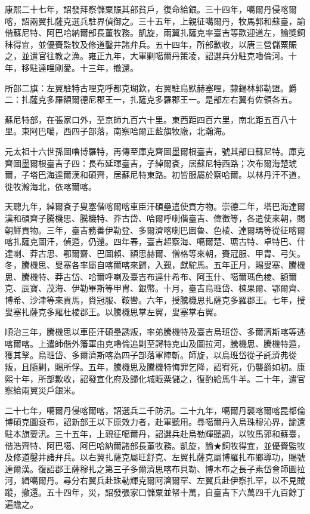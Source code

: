 \begin{pinyinscope}
康熙二十七年，詔發拜察儲粟賑其部貧戶，復命給銀。三十四年，噶爾丹侵喀爾喀，詔兩翼扎薩克選兵駐界偵御之。三十五年，上親征噶爾丹，牧馬郭和蘇臺，諭偕蘇尼特、阿巴哈納爾部長董牧務。凱旋，兩翼扎薩克率臺吉等歡迎道左，諭獎飼秣得宜，並優賚監牧及修道鑿井諸弁兵。五十四年，所部歉收，以唐三營儲粟賑之，並遣官往教之漁。雍正九年，大軍剿噶爾丹策凌，詔選兵分駐克嚕倫河。十年，移駐達哩剛愛。十三年，撤還。

所部二旗：左翼駐特古哩克呼都克瑚欽，右翼駐烏默赫塞哩，隸錫林郭勒盟。爵二：扎薩克多羅額爾德尼郡王一，扎薩克多羅郡王一。是部左右翼有佐領各五。

蘇尼特部，在張家口外，至京師九百六十里。東西距四百六里，南北距五百八十里。東阿巴噶，西四子部落，南察哈爾正藍旗牧廠，北瀚海。

元太祖十六世孫圖嚕博羅特，再傳至庫克齊圖墨爾根臺吉，號其部曰蘇尼特。庫克齊圖墨爾根臺吉子四：長布延琿臺吉，子綽爾袞，居蘇尼特西路；次布爾海楚琥爾，子塔巴海達爾漢和碩齊，居蘇尼特東路。初皆服屬於察哈爾。以林丹汗不道，徙牧瀚海北，依喀爾喀。

天聰九年，綽爾袞子叟塞偕喀爾喀車臣汗碩壘遣使貢方物。崇德二年，塔巴海達爾漢和碩齊子騰機思、騰機特、莽古岱、哈爾呼喇偕臺吉、偉徵等，各遣使來朝，賜朝鮮貢物。三年，臺吉務善伊勒登、多爾濟喀喇巴圖魯、色棱、達爾瑪等從征喀爾喀扎薩克圖汗，偵遁，仍還。四年春，臺吉超察海、噶爾楚、瑭古特、卓特巴、什達喇、莽古思、鄂爾齋、巴圖賴、額思赫爾、僧格等來朝，賚冠服、甲胄、弓矢。冬，騰機思、叟塞各率屬自喀爾喀來歸，入覲，獻駝馬。五年正月，賜叟塞、騰機思、騰機特、莽古岱、哈爾呼喇及臺吉布達什希布、阿玉什、噶爾瑪色棱、額爾克、辰寶、茂海、伊勒畢斯等甲胄、銀幣。十月，臺吉烏班岱、棟果爾、鄂爾齊、博希、沙津等來貢馬，賚冠服、鞍轡。六年，授騰機思扎薩克多羅郡王。七年，授叟塞扎薩克多羅杜棱郡王。以騰機思掌左翼，叟塞掌右翼。

順治三年，騰機思以車臣汗碩壘誘叛，率弟騰機特及臺吉烏班岱、多爾濟斯喀等逃喀爾喀。上遣師偕外籓軍由克嚕倫追剿至諤特克山及圖拉河，騰機思、騰機特遁，獲其孥。烏班岱、多爾濟斯喀為四子部落軍陣斬。師旋，以烏班岱從子託濟弗從叛，且隨剿，賜所俘。五年，騰機思及騰機特悔罪乞降，詔宥死，仍襲爵如初。康熙十年，所部歉收，詔發宣化府及歸化城賑粟儲之，復酌給馬牛羊。二十年，遣官察給兩翼災戶銀米。

二十七年，噶爾丹侵喀爾喀，詔選兵二千防汛。二十九年，噶爾丹襲喀爾喀昆都倫博碩克圖袞布，詔新部王以下原效力者，赴軍聽用。尋噶爾丹入烏珠穆沁界，諭還駐本旗要汛。三十五年，上親征噶爾丹，詔選兵赴烏勒輝聽調，以牧馬郭和蘇臺，偕浩齊特、阿巴噶、阿巴哈納爾諸部長董牧務。凱旋，諭★飼牧得宜，並優賚監牧及修道鑿井諸弁兵。以右翼扎薩克屬旺舒克、左翼扎薩克屬博羅扎布鄉導功，賜號達爾漢。復詔郡王薩穆扎之第三子多爾濟思喀布貝勒、博木布之長子素岱會師圖拉河，緝噶爾丹。尋分右翼兵赴珠勒輝克爾阿濟爾罕、左翼兵赴伊察扎罕，以不見賊蹤，撤還。五十四年，災，詔發張家口儲粟並帑十萬，自臺吉下六萬四千九百餘丁遍贍之。


\end{pinyinscope}
